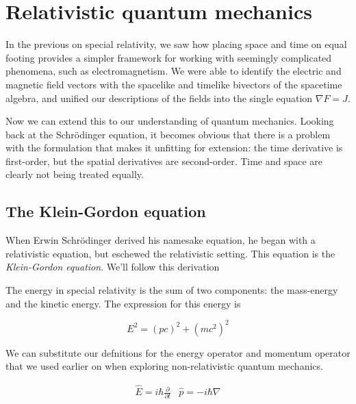 \chapter{Relativistic quantum mechanics}

In the previous on special relativity, we saw how placing space and time on equal footing provides a
simpler framework for working with seemingly complicated phenomena, such as electromagnetism. We
were able to identify the electric and magnetic field vectors with the spacelike and timelike
bivectors of the spacetime algebra, and unified our descriptions of the fields into the single
equation $\nabla F = J$.

Now we can extend this to our understanding of quantum mechanics. Looking back at the Schrödinger
equation, it becomes obvious that there is a problem with the formulation that makes it unfitting
for extension: the time derivative is first-order, but the spatial derivatives are second-order.
Time and space are clearly not being treated equally.

\section{The Klein-Gordon equation}

When Erwin Schrödinger derived his namesake equation, he began with a relativistic equation, but
eschewed the relativistic setting. This equation is the \textit{Klein-Gordon equation}. We'll follow
this derivation

The energy in special relativity is the sum of two components: the mass-energy and the kinetic
energy. The expression for this energy is

$$E^2 = (pc)^2 + (mc^2)^2$$

We can substitute our defnitions for the energy operator and momentum operator that we used earlier
on when exploring non-relativistic quantum mechanics.

\begin{align}
    \hat{E} = i\hbar\frac{\partial}{\partial t}   &   \hat{p} = -i\hbar\nabla
\end{align}

